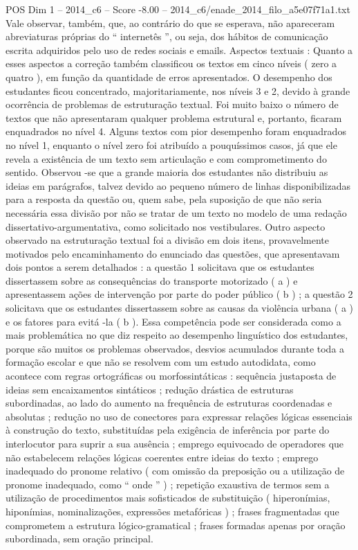 \begin{textsample}{POS Dim 1 – 2014\_c6 – Score -8.00 – 2014\_c6/enade\_2014\_filo\_a5e07f71a1.txt}
Vale observar, também, que, ao contrário do que se esperava, não apareceram abreviaturas próprias do “ internetês ”, ou seja, dos hábitos de comunicação escrita adquiridos pelo uso de redes sociais e emails.
Aspectos textuais : Quanto a esses aspectos a correção também classificou os textos em cinco níveis ( zero a quatro ), em função da quantidade de erros apresentados.
O desempenho dos estudantes ficou concentrado, majoritariamente, nos níveis 3 e 2, devido à grande ocorrência de problemas de estruturação textual.
Foi muito baixo o número de textos que não apresentaram qualquer problema estrutural e, portanto, ficaram enquadrados no nível 4.
Alguns textos com pior desempenho foram enquadrados no nível 1, enquanto o nível zero foi atribuído a pouquíssimos casos, já que ele revela a existência de um texto sem articulação e com comprometimento do sentido.
Observou -se que a grande maioria dos estudantes não distribuiu as ideias em parágrafos, talvez devido ao pequeno número de linhas disponibilizadas para a resposta da questão ou, quem sabe, pela suposição de que não seria necessária essa divisão por não se tratar de um texto no modelo de uma redação dissertativo-argumentativa, como solicitado nos vestibulares.
Outro aspecto observado na estruturação textual foi a divisão em dois itens, provavelmente motivados pelo encaminhamento do enunciado das questões, que apresentavam dois pontos a serem detalhados : a questão 1 solicitava que os estudantes dissertassem sobre as consequências do transporte motorizado ( a ) e apresentassem ações de intervenção por parte do poder público ( b ) ; a questão 2 solicitava que os estudantes dissertassem sobre as causas da violência urbana ( a ) e os fatores para evitá -la ( b ).
Essa competência pode ser considerada como a mais problemática no que diz respeito ao desempenho linguístico dos estudantes, porque são muitos os problemas observados, desvios acumulados durante toda a formação escolar e que não se resolvem com um estudo autodidata, como acontece com regras ortográficas ou morfossintáticas : sequência justaposta de ideias sem encaixamentos sintáticos ; redução drástica de estruturas subordinadas, ao lado do aumento na frequência de estruturas coordenadas e absolutas ; redução no uso de conectores para expressar relações lógicas essenciais à construção do texto, substituídas pela exigência de inferência por parte do interlocutor para suprir a sua ausência ; emprego equivocado de operadores que não estabelecem relações lógicas coerentes entre ideias do texto ; emprego inadequado do pronome relativo ( com omissão da preposição ou a utilização de pronome inadequado, como “ onde ” ) ; repetição exaustiva de termos sem a utilização de procedimentos mais sofisticados de substituição ( hiperonímias, hiponímias, nominalizações, expressões metafóricas ) ; frases fragmentadas que comprometem a estrutura lógico-gramatical ; frases formadas apenas por oração subordinada, sem oração principal.

\end{textsample}
